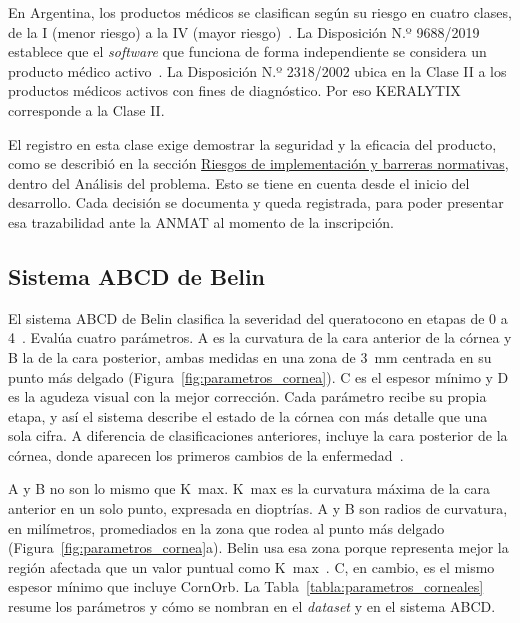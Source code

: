         En Argentina, los productos médicos se clasifican según su riesgo en cuatro clases, de la I (menor riesgo) a la IV (mayor riesgo)~\cite{dispo_2318}. La Disposición N.º 9688/2019 establece que el \textit{software} que funciona de forma independiente se considera un producto médico activo~\cite{dispo_9688}. La Disposición N.º 2318/2002 ubica en la Clase II a los productos médicos activos con fines de diagnóstico. Por eso KERALYTIX corresponde a la Clase II.

        El registro en esta clase exige demostrar la seguridad y la eficacia del producto, como se describió en la sección \hyperref[sec:riesgos]{Riesgos de implementación y barreras normativas}, dentro del Análisis del problema. Esto se tiene en cuenta desde el inicio del desarrollo. Cada decisión se documenta y queda registrada, para poder presentar esa trazabilidad ante la ANMAT al momento de la inscripción.

    \subsection{Sistema ABCD de Belin}

        El sistema ABCD de Belin clasifica la severidad del queratocono en etapas de 0 a 4~\cite{belin_abcd}. Evalúa cuatro parámetros. A es la curvatura de la cara anterior de la córnea y B la de la cara posterior, ambas medidas en una zona de 3~mm centrada en su punto más delgado (Figura~\ref{fig:parametros_cornea}). C es el espesor mínimo y D es la agudeza visual con la mejor corrección. Cada parámetro recibe su propia etapa, y así el sistema describe el estado de la córnea con más detalle que una sola cifra. A diferencia de clasificaciones anteriores, incluye la cara posterior de la córnea, donde aparecen los primeros cambios de la enfermedad~\cite{belin_abcd}.

        A y B no son lo mismo que K~max. K~max es la curvatura máxima de la cara anterior en un solo punto, expresada en dioptrías. A y B son radios de curvatura, en milímetros, promediados en la zona que rodea al punto más delgado (Figura~\ref{fig:parametros_cornea}a). Belin usa esa zona porque representa mejor la región afectada que un valor puntual como K~max~\cite{belin_abcd}. C, en cambio, es el mismo espesor mínimo que incluye CornOrb. La Tabla~\ref{tabla:parametros_corneales} resume los parámetros y cómo se nombran en el \textit{dataset} y en el sistema ABCD.

